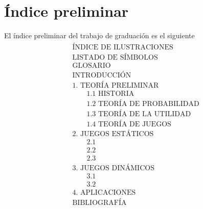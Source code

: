 \documentclass[12pt,letterpaper,titlepage]{article}
\begin{document}
\section{Índice preliminar}
El índice preliminar del trabajo de graduación es el siguiente
\begin{align*}
&\text{ÍNDICE DE ILUSTRACIONES}\\
&\text{LISTADO DE SÍMBOLOS}\\
&\text{GLOSARIO}\\
&\text{INTRODUCCIÓN}\\
&\text{1. TEORÍA PRELIMINAR}\\
&\qquad\text{1.1 HISTORIA}\\
&\qquad\text{1.2 TEORÍA DE PROBABILIDAD}\\
&\qquad\text{1.3 TEORÍA DE LA UTILIDAD}\\
&\qquad\text{1.4 TEORÍA DE JUEGOS}\\
&\text{2. JUEGOS ESTÁTICOS}\\
&\qquad\text{2.1 }\\
&\qquad\text{2.2 }\\
&\qquad\text{2.3 }\\
&\text{3. JUEGOS DINÁMICOS }\\
&\qquad\text{3.1 }\\
&\qquad\text{3.2 }\\
&\text{4. APLICACIONES }\\
&\text{BIBLIOGRAFÍA} %
\end{align*}

\newpage


\label{fin}
\end{document}
